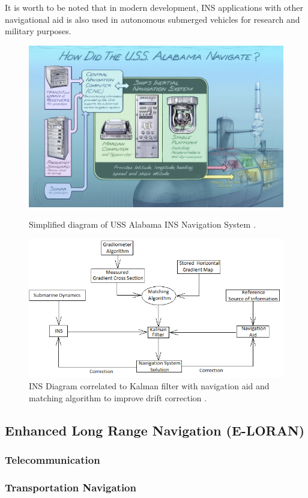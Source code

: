 \noindent It is worth to be noted that in modern development, INS applications with other navigational aid is also used in autonomous submerged vehicles for research and military purposes.

\begin{figure}[!ht]
    \centering
    \includegraphics[scale=0.5]{Figures/USS_Alabama_INS.jpg}
    \caption{Simplified diagram of USS Alabama INS Navigation System \cite{HowNavigation}. }
    \label{fig:USS_INS}
    \vspace{2mm}
    \includegraphics[scale=0.7]{Figures/INS Scheme KALMAN filter.png}
    \caption{INS Diagram correlated to Kalman filter with navigation aid and matching algorithm to improve drift correction \cite{Rogobete2018UsingPositioning}. }
    \label{fig:INS_KALMAN}
\end{figure}

\vspace{3cm}


\subsection{Enhanced Long Range Navigation (E-LORAN)}


%
\subsubsection{Telecommunication}

\subsubsection{Transportation Navigation}